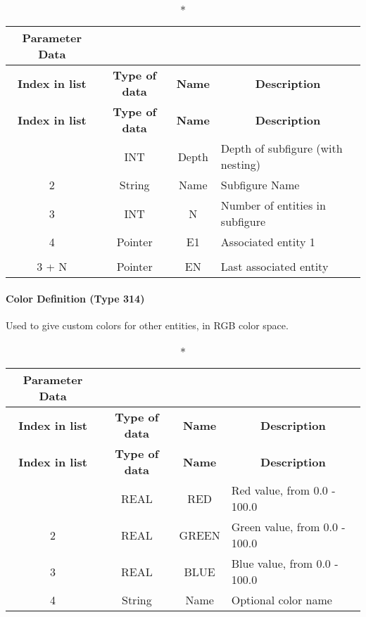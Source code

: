 \begin{longtable}[H]{|c|c|c|l|}
  \caption*{Parameter Data} \\

  \hline
  \multicolumn{1}{|c|}{\textbf{Index in list}} & \multicolumn{1}{|c|}{\textbf{Type of data}} &
  \multicolumn{1}{|c|}{\textbf{Name}} & \multicolumn{1}{|c|}{\textbf{Description}} \\ \hline
  \endfirsthead
  \hline
  
  \multicolumn{1}{|c|}{\textbf{Index in list}} & \multicolumn{1}{|c|}{\textbf{Type of data}} &
  \multicolumn{1}{|c|}{\textbf{Name}} & \multicolumn{1}{|c|}{\textbf{Description}} \\ \hline
  \endhead
  
  \endfoot

  \endlastfoot
1 & INT & Depth & Depth of subfigure (with nesting)\\ \hline
2 & String & Name & Subfigure Name\\ \hline
3 & INT & N & Number of entities in subfigure\\ \hline
4 & Pointer & E1 & Associated entity 1\\ \hline
\vtop{\hbox{\strut .}\hbox{\strut .}} &
\vtop{\hbox{\strut .}\hbox{\strut .}} &
\vtop{\hbox{\strut .}\hbox{\strut .}} &\\ \hline
3 + N & Pointer & EN & Last associated entity\\ \hline
\end{longtable}

\paragraph{Color Definition (Type 314)}\label{color-definition-type-314}

Used to give custom colors for other entities, in RGB color space.

\begin{longtable}[H]{|c|c|c|l|}
  \caption*{Parameter Data} \\

  \hline
  \multicolumn{1}{|c|}{\textbf{Index in list}} & \multicolumn{1}{|c|}{\textbf{Type of data}} &
  \multicolumn{1}{|c|}{\textbf{Name}} & \multicolumn{1}{|c|}{\textbf{Description}} \\ \hline
  \endfirsthead
  \hline
  
  \multicolumn{1}{|c|}{\textbf{Index in list}} & \multicolumn{1}{|c|}{\textbf{Type of data}} &
  \multicolumn{1}{|c|}{\textbf{Name}} & \multicolumn{1}{|c|}{\textbf{Description}} \\ \hline
  \endhead
  
  \endfoot

  \endlastfoot
1 & REAL & RED & Red value, from 0.0 - 100.0\\ \hline
2 & REAL & GREEN & Green value, from 0.0 - 100.0\\ \hline
3 & REAL & BLUE & Blue value, from 0.0 - 100.0\\ \hline
4 & String & Name & Optional color name\\ \hline
\end{longtable}

